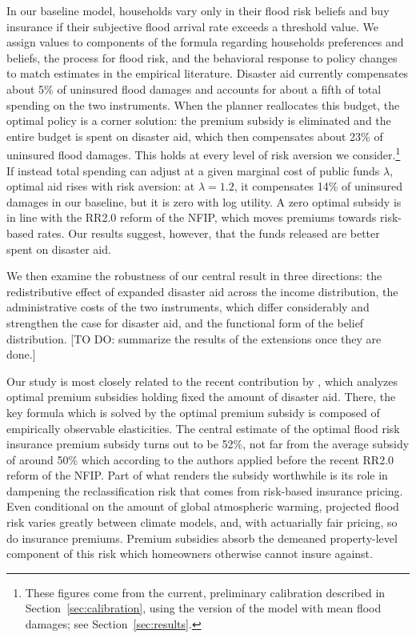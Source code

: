 \documentclass[12pt]{article}
\begin{document}
In our baseline model, households vary only in their flood risk beliefs and buy insurance if their subjective flood arrival rate exceeds a threshold value. We assign values to components of the formula regarding households preferences and beliefs, the process for flood risk, and the behavioral response to policy changes to match estimates in the empirical literature. Disaster aid currently compensates about 5\% of uninsured flood damages and accounts for about a fifth of total spending on the two instruments. When the planner reallocates this budget, the optimal policy is a corner solution: the premium subsidy is eliminated and the entire budget is spent on disaster aid, which then compensates about 23\% of uninsured flood damages. This holds at every level of risk aversion we consider.\footnote{These figures come from the current, preliminary calibration described in Section~\ref{sec:calibration}, using the version of the model with mean flood damages; see Section~\ref{sec:results}.} If instead total spending can adjust at a given marginal cost of public funds $\lambda$, optimal aid rises with risk aversion: at $\lambda=1.2$, it compensates 14\% of uninsured damages in our baseline, but it is zero with log utility. A zero optimal subsidy is in line with the RR2.0 reform of the NFIP, which moves premiums towards risk-based rates. Our results suggest, however, that the funds released are better spent on disaster aid.

We then examine the robustness of our central result in three directions: the redistributive effect of expanded disaster aid across the income distribution, the administrative costs of the two instruments, which differ considerably and strengthen the case for disaster aid, and the functional form of the belief distribution. [TO DO: summarize the results of the extensions once they are done.]

Our study is most closely related to the recent contribution by \cite{gruber2026optimal}, which analyzes optimal premium subsidies holding fixed the amount of disaster aid. There, the key formula which is solved by the optimal premium subsidy is composed of empirically observable elasticities. The central estimate of the optimal flood risk insurance premium subsidy turns out to be 52\%, not far from the average subsidy of around 50\% which according to the authors applied before the recent RR2.0 reform of the NFIP. Part of what renders the subsidy worthwhile is its role in dampening the reclassification risk that comes from risk-based insurance pricing. Even conditional on the amount of global atmospheric warming, projected flood risk varies greatly between climate models, and, with actuarially fair pricing, so do insurance premiums. Premium subsidies absorb the demeaned property-level component of this risk which homeowners otherwise cannot insure against.
\end{document}
